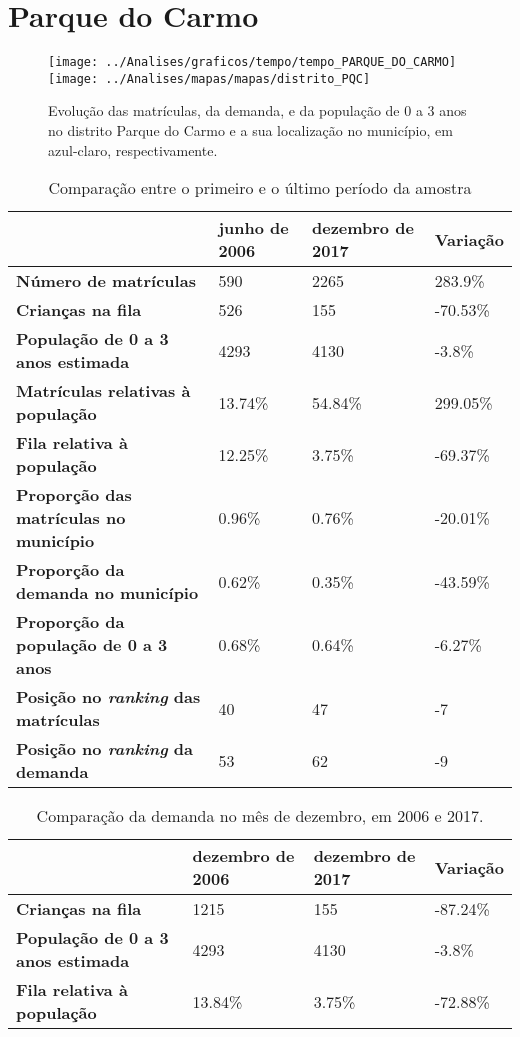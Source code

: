 \section{Parque do Carmo}
\begin{figure}[H]
\centering
\texttt{[image: ../Analises/graficos/tempo/tempo\_PARQUE\_DO\_CARMO]}
\texttt{[image: ../Analises/mapas/mapas/distrito\_PQC]}
\caption{Evolução das matrículas, da demanda, e da população de 0 a 3 anos no distrito Parque do Carmo e a sua localização no município, em azul-claro, respectivamente.}
\end{figure}
\begin{table}[H]
\begin{tabular}{l|l|l|l}
\textbf{}                                      & \textbf{junho de 2006}       & \textbf{dezembro de 2017}    & \textbf{Variação} \\ \hline
\textbf{Número de matrículas}                  & 590 & 2265 & 283.9\% \\ \hline
\textbf{Crianças na fila}                      & 526 & 155 & -70.53\% \\ \hline
\textbf{População de 0 a 3 anos estimada}      & 4293 & 4130 & -3.8\% \\ \hline
\textbf{Matrículas relativas à população}      & 13.74\% & 54.84\% & 299.05\% \\ \hline
\textbf{Fila relativa à população}             & 12.25\% & 3.75\% & -69.37\% \\ \hline
\textbf{Proporção das matrículas no município} & 0.96\% & 0.76\% & -20.01\% \\ \hline
\textbf{Proporção da demanda no município}     & 0.62\% & 0.35\% & -43.59\% \\ \hline
\textbf{Proporção da população de 0 a 3 anos}  & 0.68\% & 0.64\% & -6.27\% \\ \hline
\textbf{Posição no \textit{ranking} das matrículas}     & 40 & 47 & -7 \\ \hline
\textbf{Posição no \textit{ranking} da demanda}         & 53 & 62 & -9 \\ 
\end{tabular}
\caption{Comparação entre o primeiro e o último período da amostra}
\end{table}
\begin{table}[H]
\begin{tabular}{l|l|l|l}
\textbf{}                                 & \textbf{dezembro de 2006} & \textbf{dezembro de 2017} & \textbf{Variação} \\ \hline
\textbf{Crianças na fila}                      & 1215 & 155 & -87.24\% \\ \hline
\textbf{População de 0 a 3 anos estimada}      & 4293 & 4130 & -3.8\% \\ \hline
\textbf{Fila relativa à população}             & 13.84\% & 3.75\% & -72.88\% \\
\end{tabular}
\caption{Comparação da demanda no mês de dezembro, em 2006 e 2017.}
\end{table}

